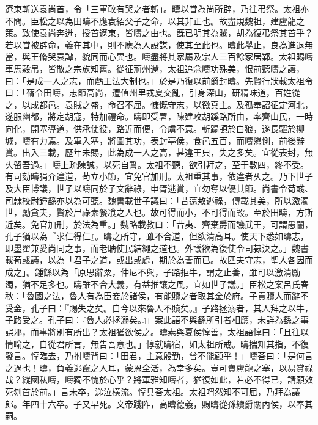 \begin{pinyinscope}
遼東斬送袁尚首，令「三軍敢有哭之者斬」。疇以甞為尚所辟，乃往弔祭。太祖亦不問。臣松之以為田疇不應袁紹父子之命，以其非正也。故盡規魏祖，建盧龍之策。致使袁尚奔迸，授首遼東，皆疇之由也。旣已明其為賊，胡為復弔祭其首乎？若以甞被辟命，義在其中，則不應為人設謀，使其至此也。疇此舉止，良為進退無當，與王脩哭袁譚，貌同而心異也。疇盡將其家屬及宗人三百餘家居鄴。太祖賜疇車馬穀帛，皆散之宗族知舊。從征荊州還，太祖追念疇功殊美，恨前聽疇之讓，曰：「是成一人之志，而虧王法大制也。」於是乃復以前爵封疇。先賢行狀載太祖令曰：「蓨令田疇，志節高尚，遭值州里戎夏交亂，引身深山，研精味道，百姓從之，以成都邑。袁賊之盛，命召不屈。慷慨守志，以徼真主。及孤奉詔征定河北，遂服幽都，將定胡寇，特加禮命。疇即受署，陳建攻胡蹊路所由，率齊山民，一時向化，開塞導道，供承使役，路近而便，令虜不意。斬蹋頓於白狼，遂長驅於柳城，疇有力焉。及軍入塞，將圖其功，表封亭侯，食邑五百，而疇懇惻，前後辭賞。出入三載，歷年未賜，此為成一人之高，甚違王典，失之多矣。宜從表封，無乆留吾過。」疇上疏陳誠，以死自誓。太祖不聽，欲引拜之，至于數四，終不受。有司劾疇狷介違道，苟立小節，宜免官加刑。太祖重其事，依違者乆之。乃下世子及大臣博議，世子以疇同於子文辭祿，申胥逃賞，宜勿奪以優其節。尚書令荀彧、司隷校尉鍾繇亦以為可聽。魏書載世子議曰：「昔薳敖逃祿，傳載其美，所以激濁世，勵貪夫，賢於尸祿素餐飡之人也。故可得而小，不可得而毀。至於田疇，方斯近矣。免官加刑，於法為重。」魏略載教曰：「昔夷、齊棄爵而譏武王，可謂愚闇，孔子猶以為『求仁得仁』。疇之所守，雖不合道，但欲清高耳。使天下悉如疇志，即墨翟兼愛尚同之事，而老聃使民結繩之道也。外議欲為復使令司隷決之。」魏書載荀彧議，以為「君子之道，或出或處，期於為善而已。故匹夫守志，聖人各因而成之」。鍾繇以為「原思辭粟，仲尼不與，子路拒牛，謂之止善，雖可以激清勵濁，猶不足多也。疇雖不合大義，有益推讓之風，宜如世子議。」臣松之案呂氏春秋：「魯國之法，魯人有為臣妾於諸侯，有能贖之者取其金於府。子貢贖人而辭不受金，孔子曰：『賜失之矣。自今以來魯人不贖矣。』子路拯溺者，其人拜之以牛，子路受之。孔子曰：『魯人必拯溺矣。』」案此語不與繇所引者相應，未詳為繇之事誤邪，而事將別有所出？太祖猶欲侯之。疇素與夏侯惇善，太祖語惇曰：「且往以情喻之，自從君所言，無告吾意也。」惇就疇宿，如太祖所戒。疇揣知其指，不復發言。惇臨去，乃拊疇背曰：「田君，主意殷勤，曾不能顧乎！」疇荅曰：「是何言之過也！疇，負義逃竄之人耳，蒙恩全活，為幸多矣。豈可賣盧龍之塞，以易賞祿哉？縱國私疇，疇獨不愧於心乎？將軍雅知疇者，猶復如此，若必不得已，請願效死刎首於前。」言未卒，涕泣橫流。惇具荅太祖。太祖喟然知不可屈，乃拜為議郎。年四十六卒。子又早死。文帝踐阼，高疇德義，賜疇從孫續爵關內侯，以奉其嗣。


\end{pinyinscope}